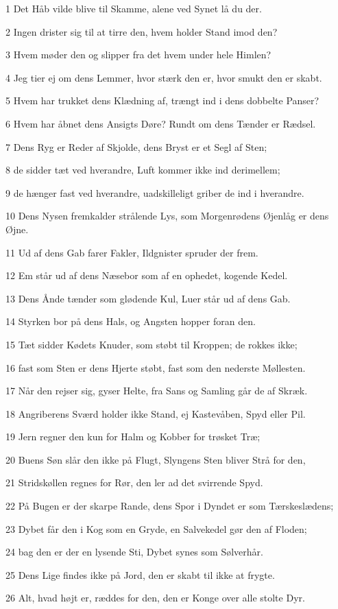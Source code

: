 \par 1 Det Håb vilde blive til Skamme, alene ved Synet lå du der.
\par 2 Ingen drister sig til at tirre den, hvem holder Stand imod den?
\par 3 Hvem møder den og slipper fra det hvem under hele Himlen?
\par 4 Jeg tier ej om dens Lemmer, hvor stærk den er, hvor smukt den er skabt.
\par 5 Hvem har trukket dens Klædning af, trængt ind i dens dobbelte Panser?
\par 6 Hvem har åbnet dens Ansigts Døre? Rundt om dens Tænder er Rædsel.
\par 7 Dens Ryg er Reder af Skjolde, dens Bryst er et Segl af Sten;
\par 8 de sidder tæt ved hverandre, Luft kommer ikke ind derimellem;
\par 9 de hænger fast ved hverandre, uadskilleligt griber de ind i hverandre.
\par 10 Dens Nysen fremkalder strålende Lys, som Morgenrødens Øjenlåg er dens Øjne.
\par 11 Ud af dens Gab farer Fakler, Ildgnister spruder der frem.
\par 12 Em står ud af dens Næsebor som af en ophedet, kogende Kedel.
\par 13 Dens Ånde tænder som glødende Kul, Luer står ud af dens Gab.
\par 14 Styrken bor på dens Hals, og Angsten hopper foran den.
\par 15 Tæt sidder Kødets Knuder, som støbt til Kroppen; de rokkes ikke;
\par 16 fast som Sten er dens Hjerte støbt, fast som den nederste Møllesten.
\par 17 Når den rejser sig, gyser Helte, fra Sans og Samling går de af Skræk.
\par 18 Angriberens Sværd holder ikke Stand, ej Kastevåben, Spyd eller Pil.
\par 19 Jern regner den kun for Halm og Kobber for trøsket Træ;
\par 20 Buens Søn slår den ikke på Flugt, Slyngens Sten bliver Strå for den,
\par 21 Stridskøllen regnes for Rør, den ler ad det svirrende Spyd.
\par 22 På Bugen er der skarpe Rande, dens Spor i Dyndet er som Tærskeslædens;
\par 23 Dybet får den i Kog som en Gryde, en Salvekedel gør den af Floden;
\par 24 bag den er der en lysende Sti, Dybet synes som Sølverhår.
\par 25 Dens Lige findes ikke på Jord, den er skabt til ikke at frygte.
\par 26 Alt, hvad højt er, ræddes for den, den er Konge over alle stolte Dyr.

